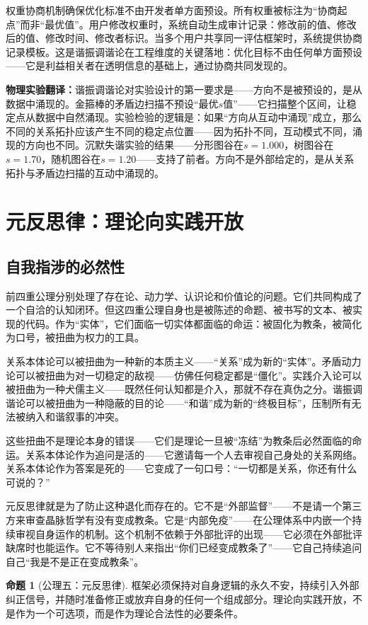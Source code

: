 \documentclass[11pt,a4paper]{book}
\theoremstyle{definition}
\newtheorem{proposition}{命题}[chapter]
\begin{document}
权重协商机制确保优化标准不由开发者单方面预设。所有权重被标注为“协商起点”而非“最优值”。用户修改权重时，系统自动生成审计记录：修改前的值、修改后的值、修改时间、修改者标识。当多个用户共享同一评估框架时，系统提供协商记录模板。这是谐振调谐论在工程维度的关键落地：优化目标不由任何单方面预设——它是利益相关者在透明信息的基础上，通过协商共同发现的。

\textbf{物理实验翻译：}谐振调谐论对实验设计的第一要求是——方向不是被预设的，是从数据中涌现的。金箍棒的矛盾边扫描不预设“最优$s$值”——它扫描整个区间，让稳定点从数据中自然涌现。实验检验的逻辑是：如果“方向从互动中涌现”成立，那么不同的关系拓扑应该产生不同的稳定点位置——因为拓扑不同，互动模式不同，涌现的方向也不同。沉默失谐实验的结果——分形图谷在$s=1.000$，树图谷在$s=1.70$，随机图谷在$s=1.20$——支持了前者。方向不是外部给定的，是从关系拓扑与矛盾边扫描的互动中涌现的。

\section{元反思律：理论向实践开放}

\subsection{自我指涉的必然性}

前四重公理分别处理了存在论、动力学、认识论和价值论的问题。它们共同构成了一个自洽的认知闭环。但这四重公理自身也是被陈述的命题、被书写的文本、被实现的代码。作为“实体”，它们面临一切实体都面临的命运：被固化为教条，被简化为口号，被扭曲为权力的工具。

关系本体论可以被扭曲为一种新的本质主义——“关系”成为新的“实体”。矛盾动力论可以被扭曲为对一切稳定的敌视——仿佛任何稳定都是“僵化”。实践介入论可以被扭曲为一种犬儒主义——既然任何认知都是介入，那就不存在真伪之分。谐振调谐论可以被扭曲为一种隐蔽的目的论——“和谐”成为新的“终极目标”，压制所有无法被纳入和谐叙事的冲突。

这些扭曲不是理论本身的错误——它们是理论一旦被“冻结”为教条后必然面临的命运。关系本体论作为追问是活的——它邀请每一个人去审视自己身处的关系网络。关系本体论作为答案是死的——它变成了一句口号：“一切都是关系，你还有什么可说的？”

元反思律就是为了防止这种退化而存在的。它不是“外部监督”——不是请一个第三方来审查晶脉哲学有没有变成教条。它是“内部免疫”——在公理体系中内嵌一个持续审视自身运作的机制。这个机制不依赖于外部批评的出现——它必须在外部批评缺席时也能运作。它不等待别人来指出“你们已经变成教条了”——它自己持续追问自己“我是不是正在变成教条”。

\begin{proposition}[公理五：元反思律]
框架必须保持对自身逻辑的永久不安，持续引入外部纠正信号，并随时准备修正或放弃自身的任何一个组成部分。理论向实践开放，不是作为一个可选项，而是作为理论合法性的必要条件。
\end{proposition}
\end{document}
